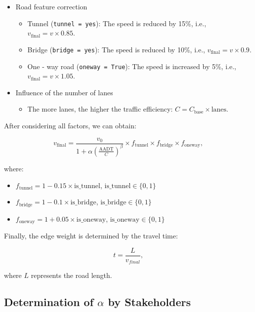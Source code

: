 \documentclass{mcmthesis}
\begin{document}
\begin{itemize}
  \item Road feature correction
    \begin{itemize}
      \item Tunnel (\texttt{tunnel = yes}): The speed is reduced by 15\%, i.e., \(v_{\text{final}} = v\times0.85\).
      \item Bridge (\texttt{bridge = yes}): The speed is reduced by 10\%, i.e., \(v_{\text{final}} = v\times0.9\).
      \item One - way road (\texttt{oneway = True}): The speed is increased by 5\%, i.e., \(v_{\text{final}} = v\times1.05\).
    \end{itemize}
  \item Influence of the number of lanes
    \begin{itemize}
      \item The more lanes, the higher the traffic efficiency: \(C = C_{\text{base}}\times\text{lanes}\).
    \end{itemize}
\end{itemize}

After considering all factors, we can obtain:

\begin{equation}
v_{\text{final}} = \frac{v_0}{1 + \alpha \left(\frac{\text{AADT}}{C}\right)^\beta}\times f_{\text{tunnel}}\times f_{\text{bridge}}\times f_{\text{oneway}},
\end{equation}

where:

\begin{itemize}
  \item \(f_{\text{tunnel}} = 1 - 0.15\times\text{is\_tunnel}\), \(\text{is\_tunnel}\in\{0,1\}\)
  \item \(f_{\text{bridge}} = 1 - 0.1\times\text{is\_bridge}\), \(\text{is\_bridge}\in\{0,1\}\)
  \item \(f_{\text{oneway}} = 1 + 0.05\times\text{is\_oneway}\), \(\text{is\_oneway}\in\{0,1\}\)
\end{itemize}

Finally, the edge weight is determined by the travel time:

\begin{equation}
t=\frac{L}{v_{final}},
\end{equation}

where \(L\) represents the road length.

\subsection{Determination of \(\alpha\) by Stakeholders}
\label{sec:alpha}
\end{document}
